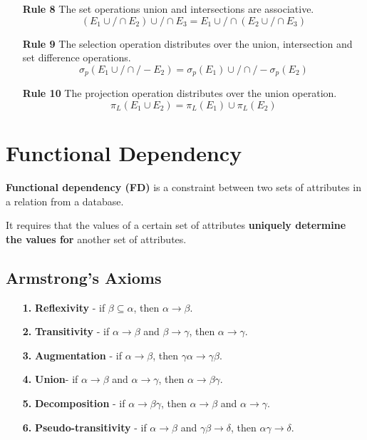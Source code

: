 \documentclass[11pt,a4paper]{article}
\begin{document}
\begin{enumerate}
    \item [\textbf{Rule 8 }] The set operations union and intersections are associative.
        \[
        (E_1 \cup / \cap E_2) \cup / \cap E_3 = E_1 \cup / \cap (E_2 \cup / \cap E_3)
        \]

    \item [\textbf{Rule 9 }] The selection operation distributes over the union, intersection and set difference operations.
        \[
        \sigma_p(E_1 \cup / \cap / - E_2) = \sigma_p(E_1) \cup / \cap / - \sigma_p(E_2)
        \]

    \item [\textbf{Rule 10 }] The projection operation distributes over the union operation.
        \[
        \pi_L(E_1 \cup E_2) = \pi_L(E_1) \cup \pi_L(E_2)
        \]
\end{enumerate}

\section{Functional Dependency}
\textbf{Functional dependency (FD)} is a constraint between two sets of attributes in a relation from a database. \par
It requires that the values of a certain set of attributes \textbf{uniquely determine the values for} another set of attributes.

\subsection{Armstrong's Axioms}
\begin{enumerate}
    \item [\textbf{1. }] \textbf{Reflexivity} - if $\beta \subseteq \alpha$, then $\alpha \rightarrow \beta$.
    
    \item [\textbf{2. }] \textbf{Transitivity} - if $\alpha \rightarrow \beta$ and $\beta \rightarrow \gamma$, then $\alpha \rightarrow \gamma$.
    
    \item [\textbf{3. }] \textbf{Augmentation} - if $\alpha \rightarrow \beta$, then $\gamma \alpha \rightarrow \gamma \beta$.

    \item [\textbf{4. }] \textbf{Union}- if $\alpha \rightarrow \beta$ and $\alpha \rightarrow \gamma$, then $\alpha \rightarrow \beta \gamma$.

    \item [\textbf{5. }] \textbf{Decomposition} - if $\alpha \rightarrow \beta \gamma$, then $\alpha \rightarrow \beta$ and $\alpha \rightarrow \gamma$.
    
    \item [\textbf{6. }] \textbf{Pseudo-transitivity} - if $\alpha \rightarrow \beta$ and $\gamma \beta \rightarrow \delta$, then $\alpha \gamma \rightarrow \delta$.
\end{enumerate}
\end{document}
